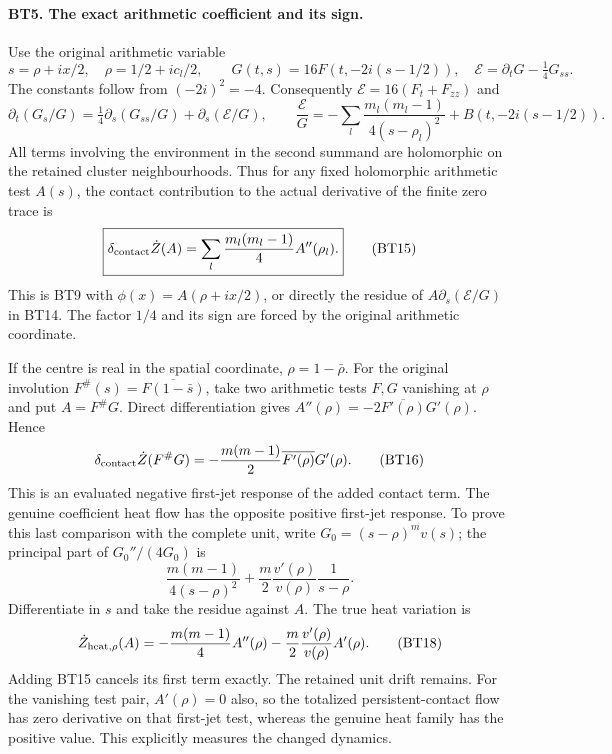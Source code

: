 \documentclass[11pt,a4paper]{article}
\theoremstyle{definition}\newtheorem{definition}[theorem]{Definition}
\begin{document}
\paragraph{BT5. The exact arithmetic coefficient and its sign.}
Use the original arithmetic variable
\[
 s=\rho+ix/2,\quad \rho=1/2+ic_l/2,\qquad
 G(t,s)=16F(t,-2i(s-1/2)),\quad
 \mathcal E=\partial_tG-\tfrac14G_{ss}.
 \tag{BT13}
\]
The constants follow from $(-2i)^2=-4$. Consequently
$\mathcal E=16(F_t+F_{zz})$ and
\[
 \partial_t(G_s/G)
 =\tfrac14\partial_s(G_{ss}/G)+\partial_s(\mathcal E/G),
 \qquad
 \frac{\mathcal E}{G}=-\sum_l\frac{m_l(m_l-1)}{4(s-\rho_l)^2}
                  +B(t,-2i(s-1/2)).
 \tag{BT14}
\]
All terms involving the environment in the second summand are
holomorphic on the retained cluster neighbourhoods. Thus for any
fixed holomorphic arithmetic test $A(s)$, the contact contribution
to the actual derivative of the finite zero trace is
\[
 \boxed{\delta_{\rm contact}\dot Z(A)
             =\sum_l\frac{m_l(m_l-1)}4 A''(\rho_l).}
 \tag{BT15}
\]
This is BT9 with $\phi(x)=A(\rho+ix/2)$, or directly the residue
of $A\partial_s(\mathcal E/G)$ in BT14. The factor $1/4$ and
its sign are forced by the original arithmetic coordinate.

If the centre is real in the spatial coordinate, $\rho=1-\bar\rho$.
For the original involution $F^\#(s)=\overline{F(1-\bar s)}$,
take two arithmetic tests $F,G$ vanishing at $\rho$ and put
$A=F^\#G$. Direct differentiation gives
$A''(\rho)=-2\overline{F'(\rho)}G'(\rho)$. Hence
\[
 \delta_{\rm contact}\dot Z(F^\#G)
       =-\frac{m(m-1)}2\overline{F'(\rho)}G'(\rho).
 \tag{BT16}
\]
This is an evaluated negative first-jet response of the added
contact term. The genuine coefficient heat flow has the opposite
positive first-jet response. To prove this last comparison with
the complete unit, write $G_0=(s-\rho)^m v(s)$; the principal
part of $G_0''/(4G_0)$ is
\[
 \frac{m(m-1)}{4(s-\rho)^2}
      +\frac m2\frac{v'(\rho)}{v(\rho)}\frac1{s-\rho}.
 \tag{BT17}
\]
Differentiate in $s$ and take the residue against $A$. The true
heat variation is
\[
 \dot Z_{\rm heat,\rho}(A)
 =-\frac{m(m-1)}4 A''(\rho)
   -\frac m2\frac{v'(\rho)}{v(\rho)}A'(\rho).
 \tag{BT18}
\]
Adding BT15 cancels its first term exactly. The retained unit
drift remains. For the vanishing test pair, $A'(\rho)=0$ also,
so the totalized persistent-contact flow has zero derivative on
that first-jet test, whereas the genuine heat family has the
positive value. This explicitly measures the changed dynamics.
\end{document}
